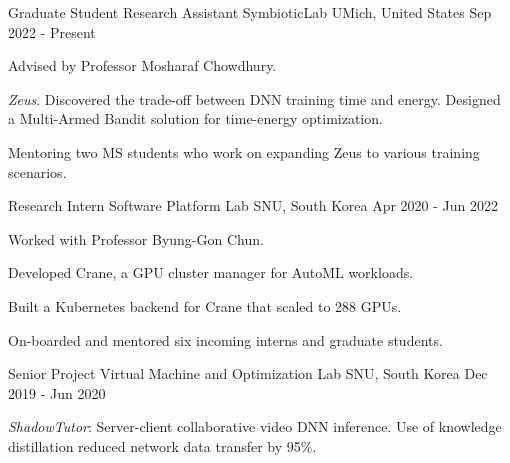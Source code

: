 

\begin{cventries}

  \cventry
    {Graduate Student Research Assistant} %
    {SymbioticLab} %
    {UMich, United States} %
    {Sep 2022 - Present} %
    {
      \begin{cvitems} %
        \item {Advised by Professor Mosharaf Chowdhury.}
        \item {\textit{Zeus}. Discovered the trade-off between DNN training time and energy. Designed a Multi-Armed Bandit solution for time-energy optimization.}
        \item {Mentoring two MS students who work on expanding Zeus to various training scenarios.}
      \end{cvitems}
    }
    
  \cventry
    {Research Intern} %
    {Software Platform Lab} %
    {SNU, South Korea} %
    {Apr 2020 - Jun 2022} %
    {
      \begin{cvitems} %
        \item {Worked with Professor Byung-Gon Chun.}
        \item {Developed Crane, a GPU cluster manager for AutoML workloads.}
        \item {Built a Kubernetes backend for Crane that scaled to 288 GPUs.}
        \item {On-boarded and mentored six incoming interns and graduate students.}
      \end{cvitems}
    }
    
  \cventry
    {Senior Project} %
    {Virtual Machine and Optimization Lab} %
    {SNU, South Korea} %
    {Dec 2019 - Jun 2020} %
    {
      \begin{cvitems} %
        \item {\textit{ShadowTutor}: Server-client collaborative video DNN inference. Use of knowledge distillation reduced network data transfer by 95\%.}
      \end{cvitems}
    }
    

\end{cventries}
